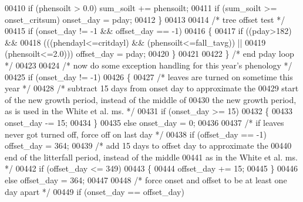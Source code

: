 \begin{DoxyCode}
{{00410                         \textcolor{keywordflow}{if} (phensoilt > 0.0) sum\_soilt += phensoilt;
00411                         \textcolor{keywordflow}{if} (sum\_soilt >= onset\_critsum) onset\_day = pday;
00412                     \}
00413                     
00414                     \textcolor{comment}{/* tree offset test */}
00415                     \textcolor{keywordflow}{if} (onset\_day != -1 && offset\_day == -1)
00416                     \{
00417                         \textcolor{keywordflow}{if} ((pday>182) && 
00418                         (((phendayl<=critdayl) && (phensoilt<=fall\_tavg)) ||
00419                         (phensoilt<=2.0))) offset\_day = pday;
00420                     \}
00421                     
00422                 \} \textcolor{comment}{/* end pday loop */}
00423                 
00424                 \textcolor{comment}{/* now do some exception handling for this year's phenology */}
00425                 \textcolor{keywordflow}{if} (onset\_day != -1)
00426                 \{
00427                     \textcolor{comment}{/* leaves are turned on sometime this year */}
00428                     \textcolor{comment}{/* subtract 15 days from onset day to approximate the}
00429 \textcolor{comment}{                    start of the new growth period, instead of the middle of}
00430 \textcolor{comment}{                    the new growth period, as is used in the White et al. ms. */}
00431                     \textcolor{keywordflow}{if} (onset\_day >= 15)
00432                     \{
00433                         onset\_day -= 15;
00434                     \}
00435                     \textcolor{keywordflow}{else} onset\_day = 0;
00436 
00437                     \textcolor{comment}{/* if leaves never got turned off, force off on last day */}
00438                     \textcolor{keywordflow}{if} (offset\_day == -1) offset\_day = 364;
00439                     \textcolor{comment}{/* add 15 days to offset day to approximate the}
00440 \textcolor{comment}{                    end of the litterfall period, instead of the middle}
00441 \textcolor{comment}{                    as in the White et al. ms. */}
00442                     \textcolor{keywordflow}{if} (offset\_day <= 349)
00443                     \{
00444                         offset\_day += 15;
00445                     \}
00446                     \textcolor{keywordflow}{else} offset\_day = 364;
00447                     
00448                     \textcolor{comment}{/* force onset and offset to be at least one day apart */}
00449                     \textcolor{keywordflow}{if} (onset\_day == offset\_day)
}}
\end{DoxyCode}
